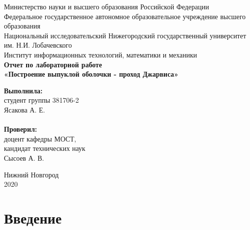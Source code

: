 \documentclass{report}
\begin{document}
\begin{titlepage}

\begin{center}
Министерство науки и высшего образования Российской Федерации \\
\vspace{5mm}
Федеральное государственное автономное образовательное учреждение высшего образования \\
Национальный исследовательский Нижегородский государственный университет им. Н.И. Лобачевского \\
\vspace{1cm}
Институт информационных технологий, математики и механики \\
\vspace{5cm}
\textbf{\large Отчет по лабораторной работе} \\
\vspace{8mm}
\textbf{\Large «Построение выпуклой оболочки - проход Джарвиса»} \\
\end{center}

\vspace{3cm}

\newbox{\lbox}
\newlength{\maxl}
\setlength{\maxl}{\wd\lbox}
\hfill\parbox{7cm}{
\hspace*{5cm}\hspace*{-5cm}\textbf{Выполнила:} \\ студент группы 381706-2 \\ Ясакова А. Е.\\
\\
\hspace*{5cm}\hspace*{-5cm}\textbf{Проверил:}\\ доцент кафедры МОСТ, \\ кандидат технических наук \\ Сысоев А. В.
}

\vspace{\fill}

\begin{center}
Нижний Новгород \\ 2020
\end{center}
\end{titlepage}

\setcounter{page}{2}

\tableofcontents

\newpage

\section{Введение}
 
\end{document}
